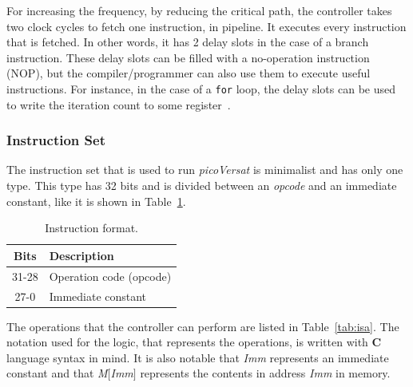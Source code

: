 For increasing the frequency, by reducing the critical path, the controller
takes two clock cycles to fetch one instruction, in pipeline.  It executes every
instruction that is fetched.  In other words, it has 2 delay slots in the case
of a branch instruction.  These delay slots can be filled with a no-operation
instruction ({\sc NOP}), but the compiler/programmer can also use them to
execute useful instructions.  For instance, in the case of a {\tt for}
loop, the delay slots can be used to write the iteration count to some
register~\cite{Lopes2017}.

\subsubsection{Instruction Set}

The instruction set that is used to run {\it picoVersat} is minimalist and
has only one type.  This type has 32 bits and is divided between an
{\it opcode} and an immediate constant, like it is shown in Table~\ref{tab:if}.

\begin{table}[!htbp]
  \centering
    \begin{tabular}{|c|p{7cm}|}
    \hline
    {\bf Bits} & {\bf Description} \\
    \hline \hline
     31-28 & Operation code (opcode)\\
    \hline
     27-0 & Immediate constant \\
    \hline

    \end{tabular}
  \caption{Instruction format.}
  \label{tab:if}
\end{table}

The operations that the controller can perform are listed in
Table~\ref{tab:isa}.  The notation used for the logic, that represents the
operations, is written with {\bf C} language syntax in mind.
It is also notable that {\it Imm} represents an immediate constant and that
{\it M$[$Imm$]$} represents the contents in address {\it Imm} in memory.

